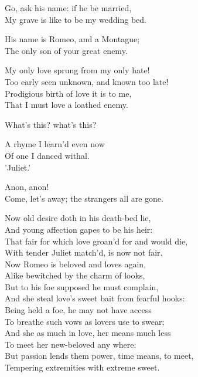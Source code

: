 \begin{speech}
Go, ask his name: if he be married, \\
My grave is like to be my wedding bed. \\
\end{speech}
\begin{speech}
His name is Romeo, and a Montague; \\
The only son of your great enemy. \\
\end{speech}
\begin{speech}
My only love sprung from my only hate! \\
Too early seen unknown, and known too late! \\
Prodigious birth of love it is to me, \\
That I must love a loathed enemy. \\
\end{speech}
\begin{speech}
What's this? what's this? \\
\end{speech}
\begin{speech}
A rhyme I learn'd even now \\
Of one I danced withal.  \\
'Juliet.' \\
\end{speech}
\begin{speech}
Anon, anon! \\
Come, let's away; the strangers all are gone. 
\\
\end{speech}




Now old desire doth in his death-bed lie, \\

And young affection gapes to be his heir: \\
That fair for which love groan'd for and would die, \\
With tender Juliet match'd, is now not fair. \\
Now Romeo is beloved and loves again, \\
Alike bewitched by the charm of looks, \\
But to his foe supposed he must complain, \\
And she steal love's sweet bait from fearful hooks: \\
Being held a foe, he may not have access \\
To breathe such vows as lovers use to swear; \\
And she as much in love, her means much less \\
To meet her new-beloved any where: \\
But passion lends them power, time means, to meet, \\
Tempering extremities with extreme sweet.  \\


